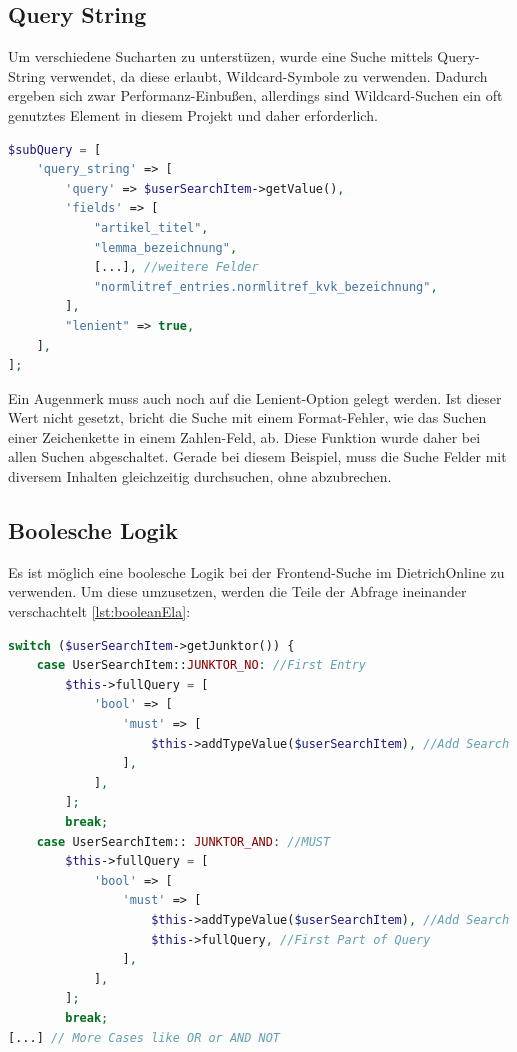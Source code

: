 \subsection{Query String}
Um verschiedene Sucharten zu unterstüzen, wurde eine Suche mittels Query-String verwendet, da diese erlaubt, Wildcard-Symbole zu verwenden. Dadurch ergeben sich zwar Performanz-Einbußen, allerdings sind Wildcard-Suchen ein oft genutztes Element in diesem Projekt und daher erforderlich.

\begin{lstlisting}[language=PHP, frame=single, label={lst:aufbauQueryString}, caption=Beispiel eines Query-Strings,captionpos=b] 
$subQuery = [
    'query_string' => [
        'query' => $userSearchItem->getValue(),
        'fields' => [
            "artikel_titel",
            "lemma_bezeichnung",
            [...], //weitere Felder
            "normlitref_entries.normlitref_kvk_bezeichnung",
        ],
        "lenient" => true,
    ],
];
\end{lstlisting}

Ein Augenmerk muss auch noch auf die Lenient-Option gelegt werden. Ist dieser Wert nicht gesetzt, bricht die Suche mit einem Format-Fehler, wie das Suchen einer Zeichenkette in einem Zahlen-Feld, ab. Diese Funktion wurde daher bei allen Suchen abgeschaltet. Gerade bei diesem Beispiel, muss die Suche Felder mit diversem Inhalten gleichzeitig durchsuchen, ohne abzubrechen. 

\subsection{Boolesche Logik}

Es ist möglich eine boolesche Logik bei der Frontend-Suche im DietrichOnline zu verwenden. Um diese umzusetzen, werden die Teile der Abfrage ineinander verschachtelt \ref{lst:booleanEla}:

\begin{lstlisting}[language=PHP, frame=single, label={lst:booleanEla}, caption=Auschnitt aus der boolischen Logik für das DietrichOnline-Projekt,captionpos=b] 
switch ($userSearchItem->getJunktor()) {
    case UserSearchItem::JUNKTOR_NO: //First Entry
        $this->fullQuery = [
            'bool' => [
                'must' => [
                    $this->addTypeValue($userSearchItem), //Add Search
                ],
            ],
        ];
        break;
    case UserSearchItem:: JUNKTOR_AND: //MUST
        $this->fullQuery = [
            'bool' => [
                'must' => [
                    $this->addTypeValue($userSearchItem), //Add Search
                    $this->fullQuery, //First Part of Query
                ],
            ],
        ];
        break;
[...] // More Cases like OR or AND NOT
\end{lstlisting}

